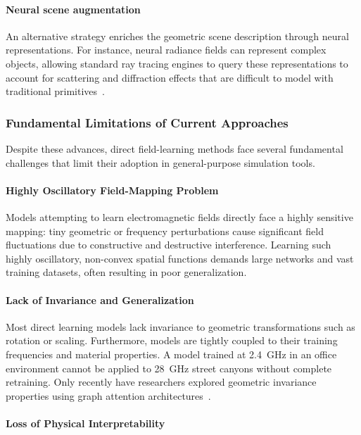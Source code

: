 \paragraph{Neural scene augmentation} An alternative strategy enriches the geometric scene description through neural representations. For instance, neural radiance fields can represent complex objects, allowing standard ray tracing engines to query these representations to account for scattering and diffraction effects that are difficult to model with traditional primitives~.

\subsubsection{Fundamental Limitations of Current Approaches}

Despite these advances, direct field-learning methods face several fundamental challenges that limit their adoption in general-purpose simulation tools.

\paragraph{Highly Oscillatory Field-Mapping Problem}

Models attempting to learn electromagnetic fields directly face a highly sensitive mapping: tiny geometric or frequency perturbations cause significant field fluctuations due to constructive and destructive interference. Learning such highly oscillatory, non-convex spatial functions demands large networks and vast training datasets, often resulting in poor generalization.

\paragraph{Lack of Invariance and Generalization}

Most direct learning models lack invariance to geometric transformations such as rotation or scaling. Furthermore, models are tightly coupled to their training frequencies and material properties. A model trained at \qty{2.4}{\giga\hertz} in an office environment cannot be applied to \qty{28}{\giga\hertz} street canyons without complete retraining. Only recently have researchers explored geometric invariance properties using graph attention architectures~.

\paragraph{Loss of Physical Interpretability}

